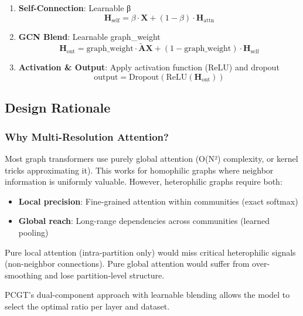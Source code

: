 \documentclass[11pt, a4paper]{article}
\begin{document}
\begin{enumerate}
    \item \textbf{Self-Connection}: Learnable β
    \begin{equation}
    \mathbf{H}_{\text{self}} = \beta \cdot \mathbf{X} + (1 - \beta) \cdot \mathbf{H}_{\text{attn}}
    \end{equation}
    
    \item \textbf{GCN Blend}: Learnable graph\_weight
    \begin{equation}
    \mathbf{H}_{\text{out}} = \text{graph\_weight} \cdot \tilde{\mathbf{A}} \mathbf{X} + (1 - \text{graph\_weight}) \cdot \mathbf{H}_{\text{self}}
    \end{equation}
    
    \item \textbf{Activation \& Output}: Apply activation function (ReLU) and dropout
    \begin{equation}
    \text{output} = \text{Dropout}(\text{ReLU}(\mathbf{H}_{\text{out}}))
    \end{equation}
\end{enumerate}

\subsection{Design Rationale}

\subsubsection{Why Multi-Resolution Attention?}

Most graph transformers use purely global attention (O(N²) complexity, or kernel tricks approximating it). This works for homophilic graphs where neighbor information is uniformly valuable. However, heterophilic graphs require both:
\begin{itemize}
    \item \textbf{Local precision}: Fine-grained attention within communities (exact softmax)
    \item \textbf{Global reach}: Long-range dependencies across communities (learned pooling)
\end{itemize}

Pure local attention (intra-partition only) would miss critical heterophilic signals (non-neighbor connections). Pure global attention would suffer from over-smoothing and lose partition-level structure.

PCGT's dual-component approach with learnable blending allows the model to select the optimal ratio per layer and dataset.
\end{document}
